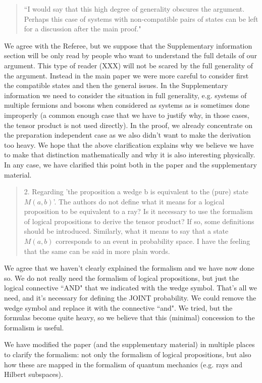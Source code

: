 \documentclass[11pt]{article}
\begin{document}
\begin{quote}
``I would say that this high degree of generality obscures
the argument. Perhaps this case of systems with non-compatible pairs
of states can be left for a discussion after the main proof."
\end{quote}
We agree with the Referee, but we suppose that the Supplementary
information section will be only read by people who want to understand
the full details of our argument. This type of reader (XXX) will not be
scared by the full generality of the argument. Instead in the main
paper we were more careful to consider first the compatible states and
then the general issues. In the Supplementary information we need to
consider the situation in full generality, e.g.  systems of multiple
fermions and bosons when considered as systems as is sometimes done
improperly (a common enough case that we have to justify why, in those
cases, the tensor product is not used directly). In the proof, we
already concentrate on the preparation independent case as we also
didn't want to make the derivation too heavy. We hope that the above
clarification explains why we believe we have to make that distinction
mathematically and why it is also interesting physically. In any case,
we have clarified this point both in the paper and the supplementary
material.

\begin{quote}
2. Regarding 'the proposition a wedge b is equivalent to
the (pure) state $M (a, b)$'. The authors do not define what it means
for a logical proposition to be equivalent to a ray? Is it necessary
to use the formalism of logical propositions to derive the tensor
product? If so, some definitions should be introduced.  Similarly,
what it means to say that a state $M (a, b)$ corresponds to an event in
probability space. I have the feeling that the same can be said in
more plain words.
\end{quote}

We agree that we haven't clearly explained the formalism and we have
now done so. We do not really need the formalism of logical
propositions, but just the logical connective ``AND" that we indicated
with the wedge symbol. That's all we need, and it's necessary for
defining the JOINT probability. We could remove the wedge symbol and
replace it with the connective ``and". We tried, but the formulas
become quite heavy, so we believe that this (minimal) concession to
the formalism is useful. 
	
We have modified the paper (and the supplementary material) in
multiple places to clarify the formalism: not only the formalism of
logical propositions, but also how these are mapped in the formalism of quantum mechanics
(e.g. rays and Hilbert subspaces).
\end{document}
